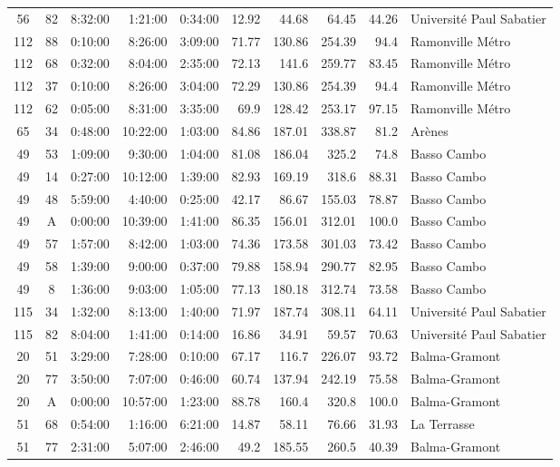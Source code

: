 \documentclass[twoside,12pt]{article}
\begin{document}
\begin{footnotesize}
\begin{longtable}{|c|c|r|r|r|r|r|r|r|l|}
	56	&	82	&	8:32:00	&	1:21:00	&	0:34:00	&	12.92	&	44.68	&	64.45	&	44.26	&	Université Paul Sabatier	\\
	112	&	88	&	0:10:00	&	8:26:00	&	3:09:00	&	71.77	&	130.86	&	254.39	&	94.4	&	Ramonville Métro	\\
	112	&	68	&	0:32:00	&	8:04:00	&	2:35:00	&	72.13	&	141.6	&	259.77	&	83.45	&	Ramonville Métro	\\
	112	&	37	&	0:10:00	&	8:26:00	&	3:04:00	&	72.29	&	130.86	&	254.39	&	94.4	&	Ramonville Métro	\\
	112	&	62	&	0:05:00	&	8:31:00	&	3:35:00	&	69.9	&	128.42	&	253.17	&	97.15	&	Ramonville Métro	\\
	65	&	34	&	0:48:00	&	10:22:00	&	1:03:00	&	84.86	&	187.01	&	338.87	&	81.2	&	Arènes	\\
	49	&	53	&	1:09:00	&	9:30:00	&	1:04:00	&	81.08	&	186.04	&	325.2	&	74.8	&	Basso Cambo	\\
	49	&	14	&	0:27:00	&	10:12:00	&	1:39:00	&	82.93	&	169.19	&	318.6	&	88.31	&	Basso Cambo	\\
	49	&	48	&	5:59:00	&	4:40:00	&	0:25:00	&	42.17	&	86.67	&	155.03	&	78.87	&	Basso Cambo	\\
	49	&	A	&	0:00:00	&	10:39:00	&	1:41:00	&	86.35	&	156.01	&	312.01	&	100.0	&	Basso Cambo	\\
	49	&	57	&	1:57:00	&	8:42:00	&	1:03:00	&	74.36	&	173.58	&	301.03	&	73.42	&	Basso Cambo	\\
	49	&	58	&	1:39:00	&	9:00:00	&	0:37:00	&	79.88	&	158.94	&	290.77	&	82.95	&	Basso Cambo	\\
	49	&	8	&	1:36:00	&	9:03:00	&	1:05:00	&	77.13	&	180.18	&	312.74	&	73.58	&	Basso Cambo	\\
	115	&	34	&	1:32:00	&	8:13:00	&	1:40:00	&	71.97	&	187.74	&	308.11	&	64.11	&	Université Paul Sabatier	\\
	115	&	82	&	8:04:00	&	1:41:00	&	0:14:00	&	16.86	&	34.91	&	59.57	&	70.63	&	Université Paul Sabatier	\\
	20	&	51	&	3:29:00	&	7:28:00	&	0:10:00	&	67.17	&	116.7	&	226.07	&	93.72	&	Balma-Gramont	\\
	20	&	77	&	3:50:00	&	7:07:00	&	0:46:00	&	60.74	&	137.94	&	242.19	&	75.58	&	Balma-Gramont	\\
	20	&	A	&	0:00:00	&	10:57:00	&	1:23:00	&	88.78	&	160.4	&	320.8	&	100.0	&	Balma-Gramont	\\
	51	&	68	&	0:54:00	&	1:16:00	&	6:21:00	&	14.87	&	58.11	&	76.66	&	31.93	&	La Terrasse	\\
	51	&	77	&	2:31:00	&	5:07:00	&	2:46:00	&	49.2	&	185.55	&	260.5	&	40.39	&	Balma-Gramont	\\

\end{longtable}
\end{footnotesize}
\end{document}
